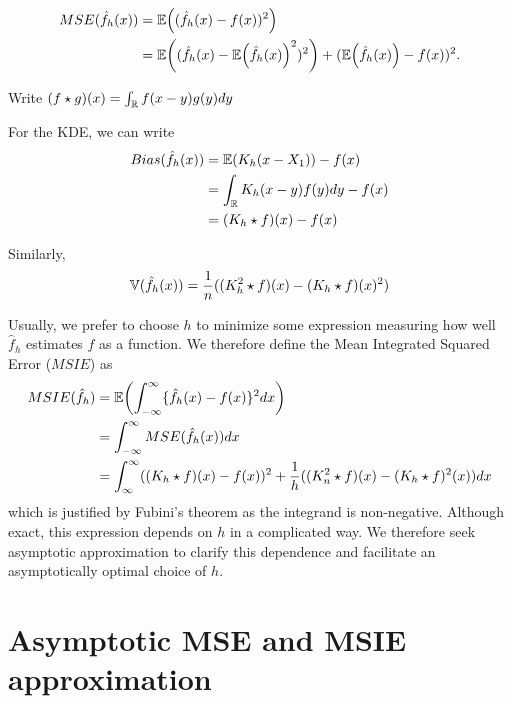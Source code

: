 \begin{defn}[MSE]
  \label{sec:density-estimators-3}
  \begin{align}
    \label{eq:147}
    MSE(\hat f_{h}(x)) &= \E{(\hat f_{h}(x) - f(x))^{2}} \\
    \label{eq:148}
    &= \E{(\hat f_{h}(x) - \E{\hat f_{h}(x)}^{2})^{2}} + (\E{\hat
      f_{h}(x)} - f(x))^{2}.
  \end{align}

  Write $(f \star g)(x) = \int_{\mathbb{R}} f(x - y) g(y) dy$
\end{defn}

\begin{thm}
  For the KDE, we can write
  \begin{align}
    \label{eq:149}
    Bias(\hat f_{h}(x)) &= \E{K_{h}(x - X_{1})} - f(x) \\
    &= \int_{\R} K_{h}(x - y) f(y) dy - f(x) \\
    \label{eq:150}
    &= (K_{h} \star f)(x) - f(x)
  \end{align}

  Similarly,
  \begin{align}
    \label{eq:152}
    \Var(\hat f_{h}(x)) = \frac{1}{n} ((K_{h}^{2} \star f)(x) - (K_{h}
    \star f)(x)^{2})
  \end{align}
\end{thm}



Usually, we prefer to choose $h$ to minimize some expression measuring
how well $\hat f_{h}$ estimates $f$ as a function.  We therefore
define the Mean Integrated Squared Error ($MSIE$) as
\begin{align}
  \label{eq:14}
  MSIE(\hat f_{h}) &= \E{\int_{-\infty}^{\infty} \{ \hat f_{h}(x) -
    f(x) \}^{2} dx} \\
  &= \int_{-\infty}^{\infty} MSE(\hat f_{h}(x)) dx \\
  &= \int_{\infty}^{\infty} ((K_{h} \star f)(x) - f(x))^{2} +
  \frac{1}{h} ((K^{2}_{n} \star f)(x) - (K_{h} \star f)^{2}(x)) dx
\end{align} which is justified by Fubini's theorem as the integrand
is non-negative.
Although exact, this expression depends on $h$ in a complicated way.
We therefore seek asymptotic approximation to clarify this dependence
and facilitate an asymptotically optimal choice of $h$.

\section{Asymptotic MSE and MSIE approximation}
\label{sec:asynptotic-mse-msie}

